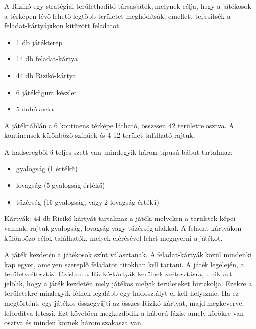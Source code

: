\newcommand\cim[1]{\noindent{\textbf{#1}}}

A Rizikó egy stratégiai területhódító társasjáték, melynek célja, hogy a játékosok a térképen lévő lehető legtöbb területet meghódítsák, emellett teljesítsék a feladat-kártyájukon kitűzött feladatot.\\


\cim{Tartozékok}
\begin{itemize}
\item 1 db játékterep 
\item 14 db feladat-kártya 
\item 44 db Rizikó-kártya 
\item 6 játékfigura készlet 
\item 5 dobókocka 
\end{itemize}

\noindent A játéktáblán a 6 kontinens térképe látható, összesen 42 területre osztva. A kontinensek különböző színűek és 4-12 terület található rajtuk.

\noindent A hadseregből 6 teljes szett van, mindegyik három típusú bábut tartalmaz:
\begin{itemize}
\item gyalogság (1 értékű) 
\item lovagság (5 gyalogság értékű) 
\item tüzérség (10 gyalogság, vagy 2 lovagság értékű)
\end{itemize}

\noindent Kártyák: 44 db Rizikó-kártyát tartalmaz a játék, melyeken a területek képei vannak, rajtuk gyalogság, lovagság vagy tüzérség alakkal. A feladat-kártyákon különböző célok találhatók, melyek elérésével lehet megnyerni a játékot.\\

\cim{Játékszabály}

A játék kezdetén a játékosok színt választanak. A feladat-kártyák közül mindenki kap egyet, amelyen szereplő feladatot titokban kell tartani. A játék legelején, a területszétosztási fázisban a Rizikó-kártyák kerülnek szétosztásra, amik azt jelölik, hogy a játék kezdetén mely játékos melyik területeket birtokolja. Ezekre a területekre mindegyik félnek legalább egy hadosztályt el kell helyeznie. Ha ez megtörtént, egy játékos összegyűjti az összes Rizikó-kártyát, majd megkeverve, lefordítva leteszi. Ezt követően megkezdődik a háború fázis, amely körökre van osztva és minden körnek három szakasza van.\\

